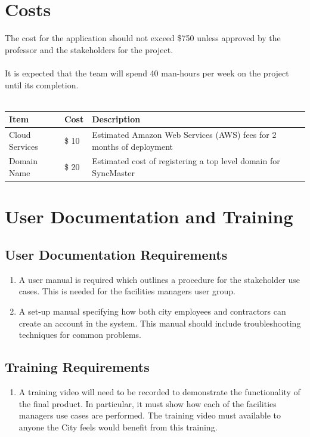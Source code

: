 \documentclass[12pt]{article}
\begin{document}
\newpage{}
\section{Costs}
The cost for the application should not exceed \$750 unless approved
by the professor and the stakeholders for the project.\\
\\
It is expected that the team will spend 40 man-hours per week on the
project until its completion.\\
\\
\begin{tabularx}{\textwidth}{p{3cm}p{2cm}X}
  \toprule {\textbf{Item}} & {\textbf{Cost}} & {\textbf{Description}}\\
  \midrule
  Cloud Services   & \$ 10     & Estimated Amazon Web Services (AWS)
  fees for 2 months of deployment\\
  Domain Name      & \$ 20     & Estimated cost of registering a top
  level domain for SyncMaster           \\
  \bottomrule
\end{tabularx}

\section{User Documentation and Training}
\subsection{User Documentation Requirements}
\begin{enumerate} [{UDT-DR}1.]
  \item A user manual is required which outlines a procedure for the stakeholder
    use cases. This is needed for the facilities managers user group.
  \item A set-up manual specifying how both city employees and contractors
    can create an account in the system. This manual should include
    troubleshooting techniques for common problems.
\end{enumerate}

\subsection{Training Requirements}
\begin{enumerate} [{UDT-TR}1.]
  \item A training video will need to be recorded to demonstrate the
    functionality of the final product. In particular, it must show how each of
    the facilities managers use cases are performed. The training
    video must available to
    anyone the City feels would benefit from this training.
\end{enumerate}
\end{document}

